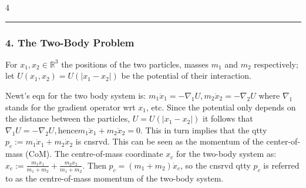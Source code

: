 \documentclass[landscape, 8pt]{extarticle}
\begin{document}
\begin{multicols*}{4}
		\hrule
		\vspace*{-3pt}
		\subsubsection*{\tiny{4. The Two-Body Problem}}
		\vspace*{-5pt}
		
		For $x_1,x_2\in\mathbb{R}^3$ the positions of the two particles, masses $m_1$ and $m_2$ respectively; let $U(x_1,x_2)=U(|x_1-x_2|)$ be the potential of their interaction.
		
		Newt's eqn for the two body system is:
		$
		m_1\ddot{x}_1=-\nabla_1 U, m_2\ddot{x}_2=-\nabla_2 U
		$
		where $\nabla_1$ stands for the gradient operator wrt $x_1$, etc. Since the potential only depends on the distance between the particles, $U=U(|x_1-x_2|)$ it follows that
		$
		\nabla_1 U = -\nabla_2 U, \text{hence} m_1\ddot{x}_1+m_2\ddot{x}_2=0.
		$
		This in turn implies that the qtty $p_c:=m_1\dot{x}_1+m_2\dot{x}_2$ is cnsrvd. This can be seen as the momentum of the center-of-mass (CoM). The centre-of-mass coordinate $x_c$ for the two-body system as:
		$
		x_c := \frac{m_1 x_1}{m_1+m_2}+\frac{m_2 x_2}{m_1+m_2}.
		$
		Then $p_c=(m_1+m_2)\dot{x}_c$, so the cnsrvd qtty $p_c$ is referred to as the centre-of-mass momentum of the two-body system.
		

\end{multicols*}
\end{document}
